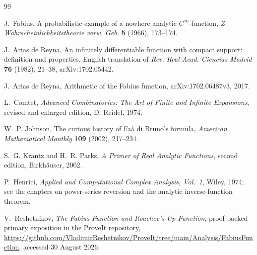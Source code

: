 \documentclass[11pt,oneside]{article}
\theoremstyle{definition}
\theoremstyle{remark}
\begin{document}
\footnotesize
\begin{thebibliography}{99}

J.~Fabius,
\newblock A probabilistic example of a nowhere analytic $C^\infty$-function,
\newblock \emph{Z. Wahrscheinlichkeitstheorie verw. Geb.} \textbf{5} (1966),
173--174.

J.~Arias de Reyna,
\newblock An infinitely differentiable function with compact support: definition and
properties,
\newblock English translation of \emph{Rev. Real Acad. Ciencias Madrid} \textbf{76}
(1982), 21--38, arXiv:1702.05442.

J.~Arias de Reyna,
\newblock Arithmetic of the Fabius function,
\newblock arXiv:1702.06487v3, 2017.

L.~Comtet,
\newblock \emph{Advanced Combinatorics: The Art of Finite and Infinite Expansions},
\newblock revised and enlarged edition, D. Reidel, 1974.

W.~P. Johnson,
\newblock The curious history of Fa\`a di Bruno's formula,
\newblock \emph{American Mathematical Monthly} \textbf{109} (2002), 217--234.

S.~G. Krantz and H.~R. Parks,
\newblock \emph{A Primer of Real Analytic Functions},
\newblock second edition, Birkh\"auser, 2002.

P.~Henrici,
\newblock \emph{Applied and Computational Complex Analysis, Vol.~1},
\newblock Wiley, 1974; see the chapters on power-series reversion and the analytic
inverse-function theorem.

V.~Reshetnikov,
\newblock \emph{The Fabius Function and Rvachev's Up Function},
\newblock proof-backed primary exposition in the ProveIt repository,
\newblock \url{https://github.com/VladimirReshetnikov/ProveIt/tree/main/Analysis/FabiusFunction},
accessed 30 August 2026.


\end{thebibliography}
\end{document}

